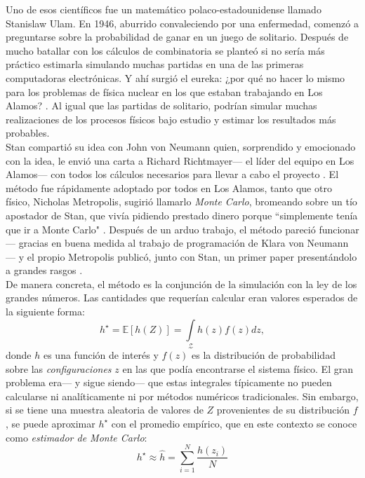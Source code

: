 Uno de esos científicos fue un matemático polaco-estadounidense llamado Stanislaw Ulam. En 1946, aburrido convaleciendo por una enfermedad, comenzó a preguntarse sobre la probabilidad de ganar en un juego de solitario. Después de mucho batallar con los cálculos de combinatoria se planteó si no sería más práctico estimarla simulando muchas partidas en una de las primeras computadoras electrónicas. Y ahí surgió el eureka: ¿por qué no hacer lo mismo para los problemas de física nuclear en los que estaban trabajando en Los Alamos? \parencite{Eckhardt87}. Al igual que las partidas de solitario, podrían simular muchas realizaciones de los procesos físicos bajo estudio y estimar los resultados más probables.\\ 

Stan compartió su idea con John von Neumann quien, sorprendido y emocionado con la idea, le envió una carta a Richard Richtmayer--- el líder del equipo en Los Alamos--- con todos los cálculos necesarios para llevar a cabo el proyecto \parencite{vonNeumann47}. El método fue rápidamente adoptado por todos en Los Alamos, tanto que otro físico, Nicholas Metropolis, sugirió llamarlo \textit{Monte Carlo}, bromeando sobre un tío apostador de Stan, que vivía pidiendo prestado dinero porque ``simplemente tenía que ir a Monte Carlo" \parencite{Metropolis87}. Después de un arduo trabajo, el método pareció funcionar--- gracias en buena medida al trabajo de programación de Klara von Neumann \parencite{Haigh14}--- y el propio Metropolis publicó, junto con Stan, un primer paper presentándolo a grandes rasgos \parencite{MetropolisUlam49}.\\

De manera concreta, el método es la conjunción de la simulación con la ley de los grandes números. Las cantidades que requerían calcular eran valores esperados de la siguiente forma: 
\begin{equation}
\label{eq:IntegralMC}
h^\star = \mathbb{E}[h(Z)]=\int\limits_\mathcal{Z} h(z)f(z)dz ,
\end{equation} 
donde $h$ es una función de interés y $f(z)$ es la distribución de probabilidad sobre las \textit{configuraciones} $z$ en las que podía encontrarse el sistema físico. El gran problema era--- y sigue siendo--- que estas integrales típicamente no pueden calcularse ni analíticamente ni por métodos numéricos tradicionales. Sin embargo, si se tiene una muestra aleatoria de valores de $Z$ provenientes de su distribución $f$, se puede aproximar $h^\star$ con el promedio empírico, que en este contexto se conoce como \textit{estimador de Monte Carlo}: 
\begin{equation*}
h^\star \approx \hat{h} = \sum\limits_{i=1}^N \dfrac{h(z_i)}{N}
\end{equation*}


